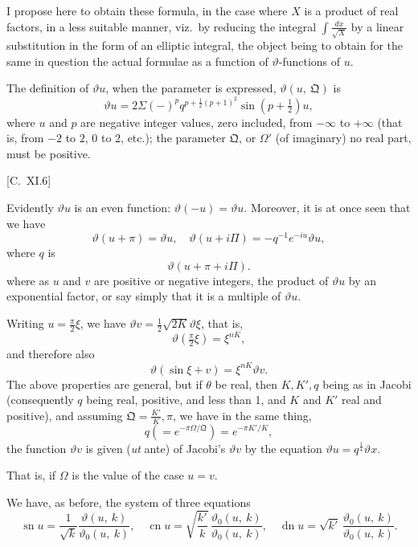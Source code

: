 \documentclass[12pt,a4paper,oneside]{book}
\newcommand{\paperref}[1]{\par\noindent\hfill[#1]\hfill\null\par}
\theoremstyle{plain}
\theoremstyle{definition}
\theoremstyle{remark}
\begin{document}
I propose here to obtain these formula, in the case where $X$ is a product of real factors, in a less suitable manner, viz.\ by reducing the integral $\int\frac{dx}{\sqrt{X}}$ by a linear substitution in the form of an elliptic integral, the object being to obtain for the same in question the actual formulae as a function of $\vartheta$-functions of $u$.

The definition of $\vartheta u$, when the parameter is expressed, $\vartheta(u,\ \mathfrak{Q})$ is
\[
\vartheta u=2\Sigma(-)^p q^{p+\frac{1}{2}(p+1)^2}\sin(p+\tfrac{1}{2})u,
\]
where $u$ and $p$ are negative integer values, zero included, from $-\infty$ to $+\infty$ (that is, from $-2$ to $2$, $0$ to $2$, etc.); the parameter $\mathfrak{Q}$, or $\Omega'$ (of imaginary) no real part, must be positive.

\paperref{C.~XI.\hfill 6}

\newpage
Evidently $\vartheta u$ is an even function: $\vartheta(-u)=\vartheta u$. Moreover, it is at once seen that we have
\[
\vartheta(u+\pi)=\vartheta u,\quad \vartheta(u+i\Pi)=-q^{-1}e^{-iu}\vartheta u,
\]
where $q$ is
\[
\vartheta(u+\pi+i\Pi).
\]
where as $u$ and $v$ are positive or negative integers, the product of $\vartheta u$ by an exponential factor, or say simply that it is a multiple of $\vartheta u$.

Writing $u=\frac{\pi}{2}\xi$, we have $\vartheta v=\frac{1}{2}\sqrt{2K}\vartheta\xi$, that is,
\[
\vartheta\left(\tfrac{\pi}{2}\xi\right)=\xi^{nK},
\]
and therefore also
\[
\vartheta(\sin\xi+v)=\xi^{nK}\vartheta v.
\]
The above properties are general, but if $\theta$ be real, then $K, K', q$ being as in Jacobi (consequently $q$ being real, positive, and less than 1, and $K$ and $K'$ real and positive), and assuming $\mathfrak{Q}=\frac{K'}{K},\pi$, we have in the same thing,
\[
q(=e^{-\pi\Omega/\mathfrak{Q}})=e^{-\pi K'/K},
\]
the function $\vartheta v$ is given (\textit{ut} ante) of Jacobi's $\vartheta v$ by the equation $\vartheta u=q^{\frac{1}{4}}\vartheta x$.

That is, if $\Omega$ is the value of the case $u=v$.

We have, as before, the system of three equations
\[
\operatorname{sn} u=\frac{1}{\sqrt{k}}\frac{\vartheta(u,\ k)}{\vartheta_0(u,\ k)},\quad \operatorname{cn} u=\sqrt{\frac{k'}{k}}\,\frac{\vartheta_0(u,\ k)}{\vartheta_0(u,\ k)},\quad \operatorname{dn} u=\sqrt{k'}\,\frac{\vartheta_0(u,\ k)}{\vartheta_0(u,\ k)}.
\]
\end{document}
